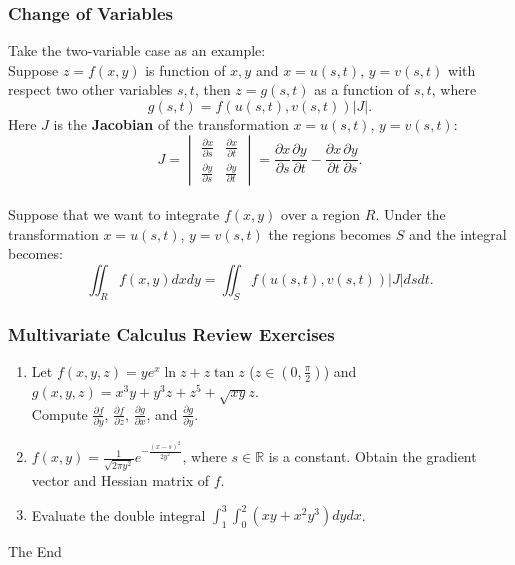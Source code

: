 \documentclass{beamer}
\begin{document}
\begin{frame} 
\frametitle{Change of Variables}
Take the two-variable case as an example:\\
Suppose $z=f(x,y)$ is function of $x,y$ and $x = u(s,t)$, $y = v(s,t)$ with respect two other variables $s,t$, then $z=g(s,t)$ as a function of $s,t$, where
$$
g(s,t) = f(u(s,t),v(s,t))\vert J\vert.
$$
Here $J$ is the \textbf{Jacobian} of the transformation $x = u(s,t)$, $y = v(s,t)$:
$$
J =
\begin{vmatrix}
\frac{\partial x}{\partial s} & \frac{\partial x}{\partial t} \\
\frac{\partial y}{\partial s} & \frac{\partial y}{\partial t}
\end{vmatrix}
= \frac{\partial x}{\partial s}\frac{\partial y}{\partial t} - \frac{\partial x}{\partial t}\frac{\partial y}{\partial s}.
$$
~\\
Suppose that we want to integrate $f(x,y)$ over a region $R$. Under the transformation $x = u(s,t)$, $y = v(s,t)$ the regions becomes $S$ and the integral becomes:
$$
\iint_R f(x,y) dxdy = \iint_S f(u(s,t),v(s,t))\vert J\vert dsdt.
$$
\end{frame}


\begin{frame}
\frametitle{Multivariate Calculus Review Exercises}
\begin{enumerate}
\item Let $f(x,y,z)=ye^x \ln z + z \tan z$ ($z \in (0,\frac{\pi}{2})$) and $g(x,y,z)=x^3y+y^3z+z^5+\sqrt{xy}z$.\\ Compute $\frac{\partial f}{\partial y}$, $\frac{\partial f}{\partial z}$, $\frac{\partial g}{\partial x}$, and $\frac{\partial g}{\partial y}$.
\vspace*{0.5in}
\item $f(x,y) = \frac{1}{\sqrt{2\pi y^2}}e^{-\frac{(x-s)^2}{2y^2}}$, where $s \in \mathbb{R}$ is a constant. Obtain the gradient vector and Hessian matrix of $f$.
\vspace*{0.5in}
\item Evaluate the double integral $\int_1^3 \int_0^2 (xy + x^2y^3)dydx$.
\end{enumerate}




\end{frame}




\begin{frame}
\Huge{\centerline{The End}}
\end{frame}

\end{document}
